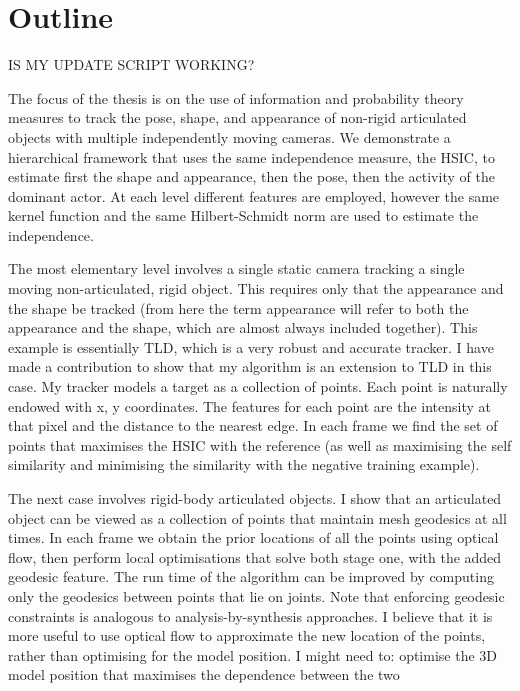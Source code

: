 \chapter{Outline}
\label{outline}

\citet{campbell16}

IS MY UPDATE SCRIPT WORKING?

The focus of the thesis is on the use of information and probability theory measures to track the pose, shape, and appearance of non-rigid articulated objects with multiple independently moving cameras. We demonstrate a hierarchical framework that uses the same independence measure, the HSIC, to estimate first the shape and appearance, then the pose, then the activity of the dominant actor. At each level different features are employed, however the same kernel function and the same Hilbert-Schmidt norm are used to estimate the independence. 

The most elementary level involves a single static camera tracking a single moving non-articulated, rigid object. This requires only that the appearance and the shape be tracked (from here the term appearance will refer to both the appearance and the shape, which are almost always included together). This example is essentially TLD, which is a very robust and accurate tracker. I have made a contribution to show that my algorithm is an extension to TLD in this case. My tracker models a target as a collection of points. Each point is naturally endowed with x, y coordinates. The features for each point are the intensity at that pixel and the distance to the nearest edge. In each frame we find the set of points that maximises the HSIC with the reference (as well as maximising the self similarity and minimising the similarity with the negative training example).

The next case involves rigid-body articulated objects. I show that an articulated object can be viewed as a collection of points that maintain mesh geodesics at all times. In each frame we obtain the prior locations of all the points using optical flow, then perform local optimisations that solve both stage one, with the added geodesic feature. The run time of the algorithm can be improved by computing only the geodesics between points that lie on joints. Note that enforcing geodesic constraints is analogous to analysis-by-synthesis approaches. I believe that it is more useful to use optical flow to approximate the new location of the points, rather than optimising for the model position. I might need to: optimise the 3D model position that maximises the dependence between the two 

